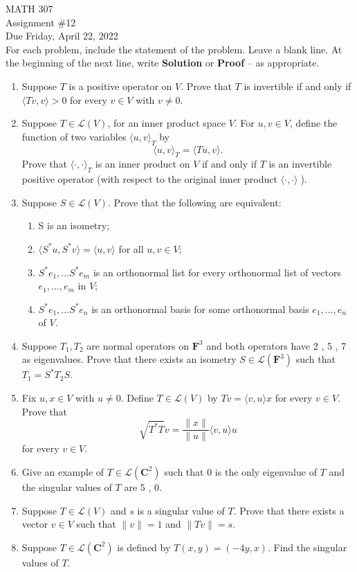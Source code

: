 \documentclass[12pt]{article}
\begin{document}
\noindent MATH 307 \\
Assignment \#12 \\
Due Friday, April 22, 2022 \\

For each problem, include the statement of the problem. Leave a blank line.  At the beginning of the next line, write \textbf{Solution} or \textbf{Proof} -- as appropriate.

\begin{enumerate}
\item Suppose $T$ is a positive operator on $V$. Prove that $T$ is invertible if and only if $\langle Tv,v \rangle >0$ for every $v \in V$ with $v \ne 0$.

\item Suppose $T \in \mathcal{L}(V)$, for an inner product space $V$. For $u , v \in V$, define the function of two variables $\langle u , v \rangle_T$ by
    \[
        \langle u , v \rangle_T = \langle Tu , v \rangle.
    \]
Prove that $\langle \cdot , \cdot \rangle_T$ is an inner product on $V$ if and only if $T$ is an invertible positive operator (with respect to the original inner product $\langle \cdot , \cdot \rangle \; $).

\item Suppose $S \in \mathcal{L}(V)$. Prove that the following are equivalent:
\begin{enumerate}
    \item S is an isometry;
    \item $\langle S^*u , S^*v \rangle = \langle u , v \rangle$ for all $u, v \in V$;
    \item $S^*e_1 , \ldots S^*e_m$ is an orthonormal list for every orthonormal list of vectors $e_1 , \ldots , e_m$ in $V$;
    \item $S^*e_1 , \ldots S^*e_n$ is an orthonormal basis for some orthonormal basis $e_1 , \ldots , e_n$ of $V$.
    \end{enumerate}

\item Suppose $T_1 , T_2$ are normal operators on $\mathbf{F}^3$ and both operators have 2 , 5 , 7 as eigenvalues. Prove that there exists an isometry $S \in \mathcal{L}(\mathbf{F}^3)$ such that $T_1 = S^*T_2S$.

\item Fix $u,  x \in V$ with $u \ne 0$. Define $T \in \mathcal{L}(V)$ by $Tv = \langle v , u \rangle x$ for every $v \in V$.  Prove that
    \[
      \sqrt{T^*T}v = \frac{\| x \|}{\| u \|} \langle v , u \rangle u
    \]
for every $v \in V$.

\item Give an example of $T \in \mathcal{L}(\mathbf{C}^2)$ such that 0 is the only eigenvalue of $T$ and the singular values of $T$ are 5 , 0.

\item Suppose $T \in \mathcal{L}(V)$ and $s$ is a singular value of $T$. Prove that there exists a vector $v \in V$ such that $\| v \| = 1$ and $\| Tv \| = s$.

\item Suppose $T \in \mathcal{L}(\mathbf{C}^2)$ is defined by $T(x,y) = (-4y,x)$. Find the singular values of $T$.

\end{enumerate}
\end{document}

